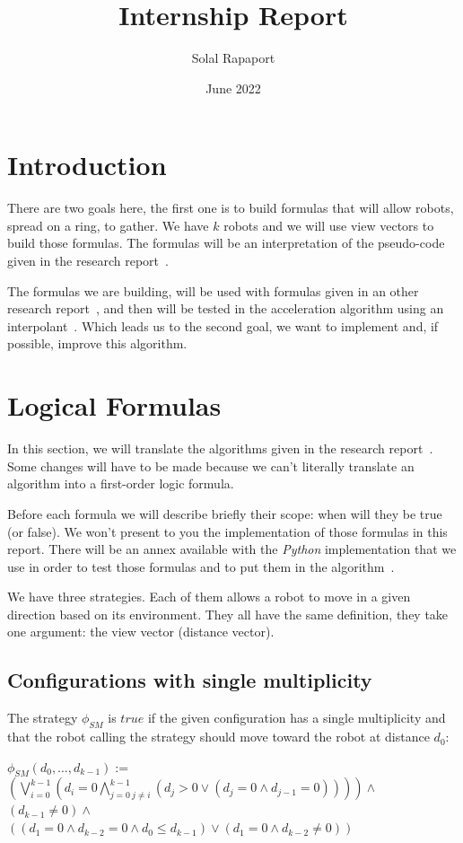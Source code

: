 \documentclass{article}
\title{Internship Report}
\author{Solal Rapaport }
\date{June 2022}
\begin{document}
\maketitle
\doublespacing
\tableofcontents
\singlespacing
\newpage

\section{Introduction}

There are two goals here, the first one is to build formulas that will allow robots, spread on a ring, to gather. We have $k$ robots and we will use view vectors to build those formulas. The formulas will be an interpretation of the pseudo-code given in the research report~\cite{gathering}.

The formulas we are building, will be used with formulas given in an other research report~\cite{algo}, and then will be tested in the acceleration algorithm using an interpolant~\cite{algo}. Which leads us to the second goal, we want to implement and, if possible, improve this algorithm.

\section{Logical Formulas}

In this section, we will translate the algorithms given in the research report~\cite{gathering}. Some changes will have to be made because we can't literally translate an algorithm into a first-order logic formula.

Before each formula we will describe briefly their scope: when will they be true  (or false). We won't present to you the implementation of those formulas in this report. There will be an annex available with the \textit{Python} implementation that we use in order to test those formulas and to put them in the algorithm~\cite{algo}.

We have three strategies. Each of them allows a robot to move in a given direction based on its environment. They all have the same definition, they take one argument: the view vector  (distance vector).

\subsection{Configurations with single multiplicity}

The strategy $\phi_{SM}$ is $true$ if the given configuration has a single multiplicity and that the robot calling the strategy should move toward the robot at distance $d_{0}$:
\begin{center}
$\phi_{SM} (d_0, \ldots , d_{k-1}):=$\\
$ (\bigvee_{i=0}^{k-1} (d_i = 0\bigwedge_{j=0\ j\not=i}^{k-1}  (d_j > 0 \lor  (d_j = 0 \land d_{j-1} = 0) ) ))\land$\\
$ (d_{k-1} \not= 0) \land $\\
$ ( (d_1 = 0 \land d_{k-2} = 0 \land d_0 \leq d_{k-1}) \lor  (d_1 = 0 \land d_{k-2} \not= 0))$
\end{center}
\end{document}
